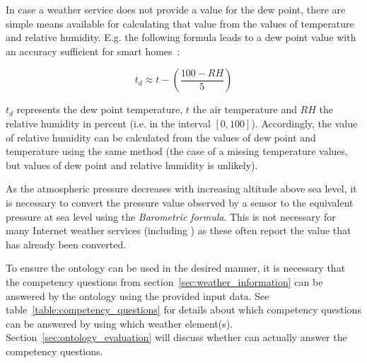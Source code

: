 In case a weather service does not provide a value for the dew point, there are simple means available for calculating that value from the values of temperature and relative humidity. E.g. the following formula leads to a dew point value with an accuracy sufficient for smart homes~\cite{dew_point_calculation}:

\[t_d \approx t-\left(\frac{100-RH}{5}\right)\]

$t_d$ represents the dew point temperature, $t$ the air temperature and $RH$ the relative humidity in percent (i.e. in the interval $[0,100]$). Accordingly, the value of relative humidity can be calculated from the values of dew point and temperature using the same method (the case of a missing temperature values, but values of dew point and relative humidity is unlikely).

As the atmospheric pressure decreases with increasing altitude above sea level, it is necessary to convert the pressure value observed by a sensor to the equivalent pressure at sea level using the \emph{Barometric formula}. %
This is not necessary for many Internet weather services (including \yrno) as these often report the value that has already been converted.

To ensure the ontology can be used in the desired manner, it is necessary that the competency questions from section~\ref{sec:weather_information} can be answered by the ontology using the provided input data. See table~\ref{table:competency_questions} for details about which competency questions can be answered by using which weather element(s). Section~\ref{sec:ontology_evaluation} will discuss whether \smarthomeweather can actually answer the competency questions.

